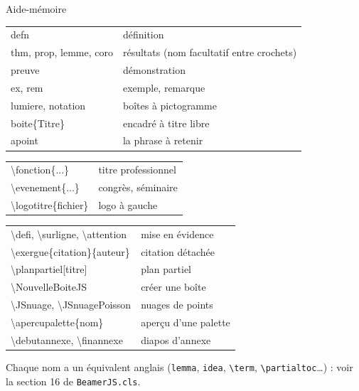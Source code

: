 \documentclass[nuit,charter,pied]{BeamerJS}
\begin{document}
\begin{frame}[allowframebreaks]{Aide-mémoire}
	\small
	\par
		\begin{tabular}{@{}>{\ttfamily\small}l l@{}}
			defn & définition \\
			thm, prop, lemme, coro & résultats (nom facultatif entre crochets) \\
			preuve & démonstration \\
			ex, rem & exemple, remarque \\
			lumiere, notation & boîtes à pictogramme \\
			boite\{Titre\} & encadré à titre libre \\
			apoint & la phrase à retenir \\
		\end{tabular}
	\medskip

	\par
		\begin{tabular}{@{}>{\ttfamily\small}l l@{}}
			\textbackslash fonction\{...\} & titre professionnel \\
			\textbackslash evenement\{...\} & congrès, séminaire \\
			\textbackslash logotitre\{fichier\} & logo à gauche \\
		\end{tabular}
	\medskip

	\framebreak

	\par
		\begin{tabular}{@{}>{\ttfamily\small}l l@{}}
			\textbackslash defi, \textbackslash surligne, \textbackslash attention
				& mise en évidence \\
			\textbackslash exergue\{citation\}\{auteur\} & citation détachée \\
			\textbackslash planpartiel[titre] & plan partiel \\
			\textbackslash NouvelleBoiteJS & créer une boîte \\
			\textbackslash JSnuage, \textbackslash JSnuagePoisson & nuages de points \\
			\textbackslash apercupalette\{nom\} & aperçu d'une palette \\
			\textbackslash debutannexe, \textbackslash finannexe & diapos d'annexe \\
		\end{tabular}
	\medskip

	\begin{rem}
		Chaque nom a un équivalent anglais (\texttt{lemma}, \texttt{idea},
		\texttt{\textbackslash term}, \texttt{\textbackslash partialtoc}…) :
		voir la section 16 de \texttt{BeamerJS.cls}.
	\end{rem}
\end{frame}
\end{document}
